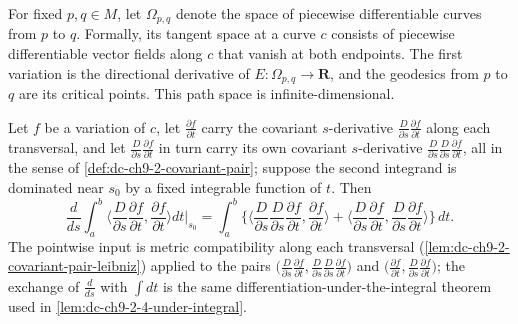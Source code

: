 \begin{remark}
  \label{rem:dc-ch9-2-7}
  For fixed $p,q\in M$, let $\Omega_{p,q}$ denote the space of piecewise
  differentiable curves from $p$ to $q$. Formally, its tangent space at a curve
  $c$ consists of piecewise differentiable vector fields along $c$ that vanish
  at both endpoints. The first variation is the directional derivative of
  $E:\Omega_{p,q}\to\mathbf{R}$, and the geodesics from $p$ to $q$ are its
  critical points. This path space is infinite-dimensional.
\end{remark}
\begin{lemma}
  \label{lem:dc-ch9-2-8-under-integral}


  Let $f$ be a variation of $c$, let $\frac{\partial f}{\partial t}$ carry the covariant
  $s$-derivative $\frac{D}{\partial s}\frac{\partial f}{\partial t}$ along each transversal,
  and let $\frac{D}{\partial s}\frac{\partial f}{\partial t}$ in turn carry its own covariant
  $s$-derivative $\frac{D}{\partial s}\frac{D}{\partial s}\frac{\partial f}{\partial t}$, all
  in the sense of \cref{def:dc-ch9-2-covariant-pair}; suppose the second integrand is
  dominated near $s_0$ by a fixed integrable function of $t$. Then
  $$
  \frac{d}{ds}\int_a^b\Big\langle\frac{D}{\partial s}\frac{\partial f}{\partial t},
    \frac{\partial f}{\partial t}\Big\rangle dt\Big|_{s_0}
  = \int_a^b\Big\{\Big\langle\frac{D}{\partial s}\frac{D}{\partial s}\frac{\partial f}{\partial t},
    \frac{\partial f}{\partial t}\Big\rangle
    + \Big\langle\frac{D}{\partial s}\frac{\partial f}{\partial t},
      \frac{D}{\partial s}\frac{\partial f}{\partial t}\Big\rangle\Big\}\,dt .
  $$
  The pointwise input is metric compatibility along each transversal
  (\cref{lem:dc-ch9-2-covariant-pair-leibniz}) applied to the pairs
  $\big(\frac{D}{\partial s}\frac{\partial f}{\partial t},
    \frac{D}{\partial s}\frac{D}{\partial s}\frac{\partial f}{\partial t}\big)$ and
  $\big(\frac{\partial f}{\partial t},\frac{D}{\partial s}\frac{\partial f}{\partial t}\big)$;
  the exchange of $\frac{d}{ds}$ with $\int dt$ is the same differentiation-under-the-integral
  theorem used in \cref{lem:dc-ch9-2-4-under-integral}.
\end{lemma}
